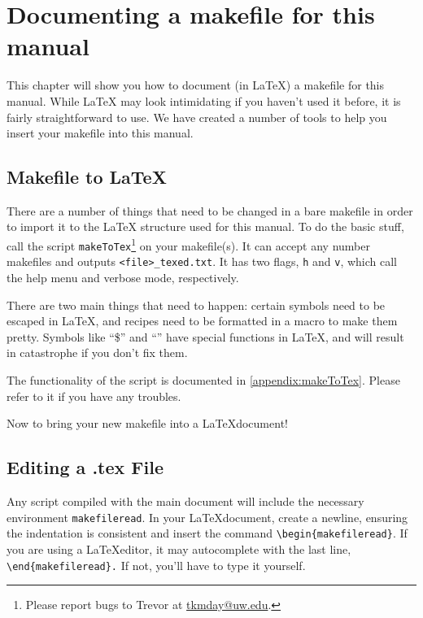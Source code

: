 \chapter{Documenting a makefile for this manual}

This chapter will show you how to document (in \LaTeX) a makefile for this manual. While \LaTeX{} may look intimidating if you haven't used it before, it is fairly straightforward to use. We have created a number of tools to help you insert your makefile into this manual.

\section{Makefile to \LaTeX}

There are a number of things that need to be changed in a bare makefile in order to import it to the \LaTeX{} structure used for this manual. To do the basic stuff, call the script \texttt{makeToTex}\footnote{Please report bugs to Trevor at \url{tkmday@uw.edu}.} on your makefile(s). It can accept any number makefiles and outputs \texttt{<file>_texed.txt}. It has two flags, \texttt{h} and \texttt{v}, which call the help menu and verbose mode, respectively.

There are two main things that need to happen: certain symbols need to be escaped in \LaTeX, and recipes need to be formatted in a  macro to make them pretty. Symbols like ``\$'' and ``\mypound'' have special functions in \LaTeX, and will result in catastrophe if you don't fix them.

The functionality of the script is documented in \autoref{appendix:makeToTex}. Please refer to it if you have any troubles.

Now to bring your new makefile into a \LaTeX document!

\section{Editing a .tex File}

Any script compiled with the main document will include the necessary environment \texttt{makefileread}. In your \LaTeX document, create a newline, ensuring the indentation is consistent and insert the command \verb!\begin{makefileread}!. If you are using a \LaTeX editor, it may autocomplete with the last line, \verb!\end{makefileread}.! If not, you'll have to type it yourself.

